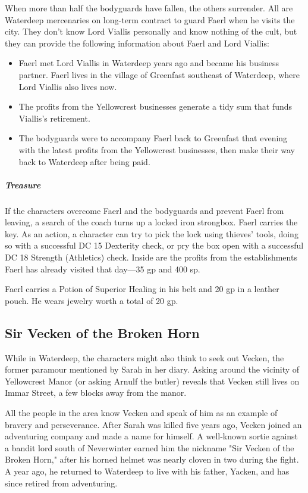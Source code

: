 \documentclass[10pt,a4paper,twoside,bg=print,twocolumn,openany,nodeprecatedcode]{dndbook}
\begin{document}
When more than half the bodyguards have fallen, the others surrender. All are Waterdeep mercenaries on long-term contract to guard Faerl when he visits the city. They don't know Lord Viallis personally and know nothing of the cult, but they can provide the following information about Faerl and Lord Viallis:


\begin{itemize}
\item Faerl met Lord Viallis in Waterdeep years ago and became his business partner. Faerl lives in the village of Greenfast southeast of Waterdeep, where Lord Viallis also lives now.
\item The profits from the Yellowcrest businesses generate a tidy sum that funds Viallis's retirement.
\item The bodyguards were to accompany Faerl back to Greenfast that evening with the latest profits from the Yellowcrest businesses, then make their way back to Waterdeep after being paid.
\end{itemize}

\subparagraph{Treasure}
If the characters overcome Faerl and the bodyguards and prevent Faerl from leaving, a search of the coach turns up a locked iron strongbox. Faerl carries the key. As an action, a character can try to pick the lock using thieves' tools, doing so with a successful DC 15 Dexterity check, or pry the box open with a successful DC 18 Strength (Athletics) check. Inside are the profits from the establishments Faerl has already visited that day—35 gp and 400 sp.

Faerl carries a Potion of Superior Healing in his belt and 20 gp in a leather pouch. He wears jewelry worth a total of 20 gp.

\subsection{Sir Vecken of the Broken Horn}
While in Waterdeep, the characters might also think to seek out Vecken, the former paramour mentioned by Sarah in her diary. Asking around the vicinity of Yellowcrest Manor (or asking Arnulf the butler) reveals that Vecken still lives on Immar Street, a few blocks away from the manor.

All the people in the area know Vecken and speak of him as an example of bravery and perseverance. After Sarah was killed five years ago, Vecken joined an adventuring company and made a name for himself. A well-known sortie against a bandit lord south of Neverwinter earned him the nickname "Sir Vecken of the Broken Horn," after his horned helmet was nearly cloven in two during the fight. A year ago, he returned to Waterdeep to live with his father, Yacken, and has since retired from adventuring.
\end{document}
